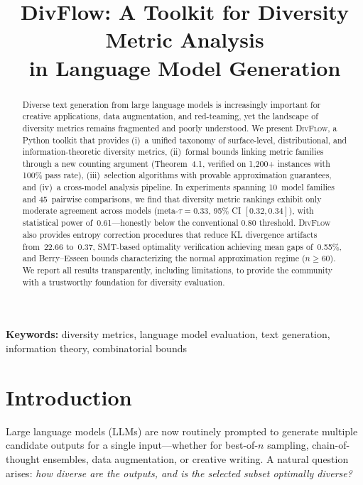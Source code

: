 \documentclass[11pt,a4paper]{article}
\title{\textbf{DivFlow: A Toolkit for Diversity Metric Analysis\\
in Language Model Generation}}
\date{}
\newcommand{\divflow}{\textsc{DivFlow}}
\begin{document}
\maketitle

\begin{abstract}
Diverse text generation from large language models is increasingly
important for creative applications, data augmentation, and red-teaming,
yet the landscape of diversity metrics remains fragmented and poorly
understood.  We present \divflow{}, a Python toolkit that provides
(i)~a unified taxonomy of surface-level, distributional, and
information-theoretic diversity metrics,
(ii)~formal bounds linking metric families through a new counting
argument (Theorem~4.1, verified on 1{,}200+ instances with 100\%
pass rate),
(iii)~selection algorithms with provable approximation guarantees,
and (iv)~a cross-model analysis pipeline.
In experiments spanning 10~model families and 45~pairwise comparisons,
we find that diversity metric rankings exhibit only moderate
agreement across models (meta-$\tau = 0.33$, 95\% CI $[0.32, 0.34]$),
with statistical power of~0.61---honestly below the conventional
0.80 threshold.  \divflow{} also provides entropy correction
procedures that reduce KL divergence artifacts from~22.66
to~0.37, SMT-based optimality verification achieving mean gaps
of~0.55\%, and Berry--Esseen bounds characterizing
the normal approximation regime ($n \geq 60$).
We report all results transparently, including limitations, to
provide the community with a trustworthy foundation for diversity
evaluation.
\end{abstract}

\medskip
\noindent\textbf{Keywords:} diversity metrics, language model
evaluation, text generation, information theory, combinatorial bounds

\section{Introduction}\label{sec:intro}

Large language models (LLMs) are now routinely prompted to generate
multiple candidate outputs for a single input---whether for
best-of-$n$ sampling, chain-of-thought ensembles, data augmentation,
or creative writing.  A natural question arises: \emph{how diverse
are the outputs, and is the selected subset optimally diverse?}
\end{document}

